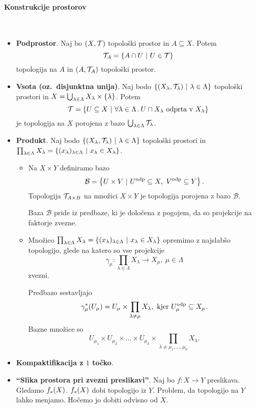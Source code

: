 \paragraph{Konstrukcije prostorov} \
\begin{itemize}
    \item \textbf{Podprostor}. Naj bo \((X, \mathcal{T})\) topološki prostor in \(A \subseteq X\). Potem \[\mathcal{T}_A = \left\{A \cap U \ | \ U \in \mathcal{T}\right\}\]
    topologija na \(A\) in \((A, \mathcal{T}_A)\) topološki prostor.
    \item \textbf{Vsota (oz.\ disjunktna unija)}. Naj bodo \(\left\{(X_\lambda, \mathcal{T}_\lambda) \ | \ \lambda \in \Lambda\right\}\) topološki prostori in \(X = \bigcup_{\lambda \in \Lambda} X_\lambda \times \left\{\lambda\right\}\). Potem \[\mathcal{T} = \left\{U \subseteq X \ | \ \forall \lambda \in \Lambda \,.\, U \cap X_\lambda \text{ odprta v } X_\lambda\right\}\]
    je topologija na \(X\) porojena z bazo \(\bigcup_{\lambda \in \Lambda} \mathcal{T}_\lambda\).
    \item \textbf{Produkt}. Naj bodo \(\left\{(X_\lambda, \mathcal{T}_\lambda) \ | \ \lambda \in \Lambda\right\}\) topološki prostori in \(\prod_{\lambda \in \Lambda} X_\lambda = \left\{(x_\lambda)_{\lambda \in \Lambda} \ | \ x_\lambda \in X_\lambda\right\}\).
    \begin{itemize}
        \item Na \(X \times Y\) definiramo bazo \[\mathcal{B} = \left\{U \times V \ | \ U^\text{odp} \subseteq X, \ V^\text{odp} \subseteq Y\right\}.\]
        Topologija \(\mathcal{T}_{A \times B}\) na množici \(X \times Y\) je topologija porojena z bazo \(\mathcal{B}\). 
        \begin{opomba}
            Baza \(\mathcal{B}\) pride iz predbaze, ki je določena z pogojem, da so projekcije na faktorje zvezne.
        \end{opomba}
        \item Množico \(\prod_{\lambda \in \Lambda} X_\lambda = \left\{(x_\lambda)_{\lambda \in \Lambda} \ | \ x_\lambda \in X_\lambda\right\}\) opremimo z najslabšo topologijo, glede na katero so vse projekcije \[\gamma_\mu: \prod_{\lambda \in \Lambda} X_\lambda \to X_\mu, \ \mu \in \Lambda\]
        zvezni.

        Predbazo sestavljajo \[\gamma_\mu^{*}(U_\mu) = U_\mu \times \prod_{\lambda \neq \mu} X_\lambda, \ \text{kjer} \ U_\mu^\text{odp} \subseteq X_\mu.\]
        Bazne množice so \[U_{\mu_1} \times U_{\mu_2} \times \ldots \times U_{\mu_k} \times \prod_{\lambda \neq \mu_1, \ldots, \mu_k}X_\lambda.\]        
    \end{itemize}
    \item \textbf{Kompaktifikacija z \(1\) točko}.
    \item \textbf{"`Slika prostora pri zvezni preslikavi"'}. Naj bo \(f: X \to Y\) preslikava. Gledamo \(f_{*}(X)\). \(f_{*}(X)\) dobi topologijo iz \(Y\). Problem, da topologijo na \(Y\) lahko menjamo. Hočemo jo dobiti odvisno od \(X\).
\end{itemize}

